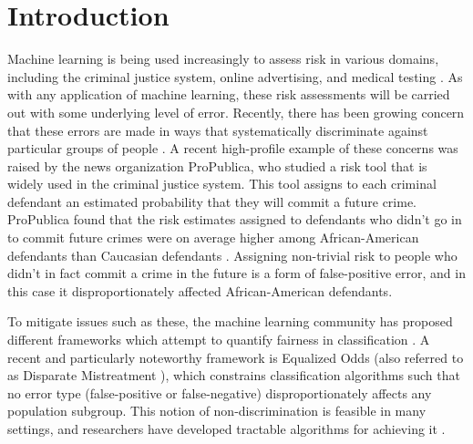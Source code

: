 \section{Introduction}
Machine learning is being used increasingly to assess risk in various domains,
including the criminal justice system, online advertising, and
medical testing \cite{whitehouse-big-data}.
As with any application of machine learning, these risk assessments
will be carried out with some underlying level of error.
Recently, there has been growing concern
that these errors are made in ways that systematically discriminate against
particular groups of people \cite{barocas2016big,berk2017fairness,chouldechova2017fair}.
%
A recent high-profile example of these concerns was raised by the
news organization ProPublica, who studied a risk tool
that is widely used in the criminal justice system.
This tool assigns to each criminal defendant an estimated probability
that they will commit a future crime.
ProPublica found that the risk estimates assigned to
defendants who didn't go in to commit future crimes were on average
higher among African-American defendants than Caucasian defendants \cite{angwin-propublica-risk-scores}.
Assigning non-trivial risk to people who didn't in fact commit a
crime in the future is a form of false-positive error, and in this case it
disproportionately affected African-American defendants.

To mitigate issues such as these,
the machine learning community has proposed different
frameworks which attempt to quantify fairness in classification
\cite{barocas2016big,berk2017fairness,chouldechova2017fair,hardt2016equality,kleinberg2016inherent,woodworth2017learning,zafar2017fairness}.
A recent and particularly noteworthy framework is Equalized Odds \cite{hardt2016equality}
(also referred to as Disparate Mistreatment \cite{zafar2017fairness}),
which constrains classification algorithms such that no error type (false-positive
or false-negative) disproportionately affects any population subgroup.
This notion of non-discrimination is feasible in many settings,
and researchers have developed tractable algorithms for achieving it \cite{hardt2016equality,goh2016satisfying,zafar2017fairness,woodworth2017learning}.
%

